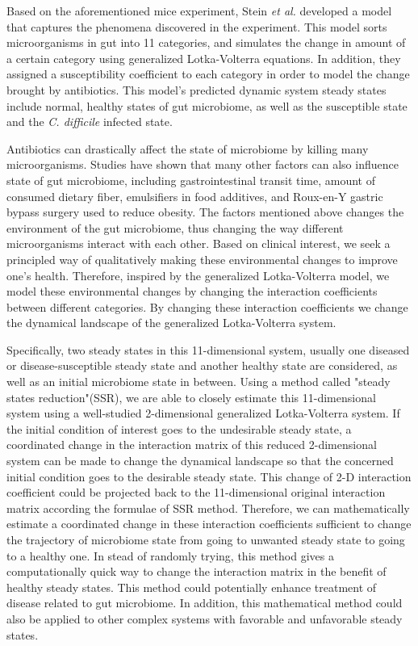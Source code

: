 \documentclass[10pt,letterpaper]{article}
\begin{document}
Based on the aforementioned mice experiment, Stein \textit{et al.} developed a model that captures the phenomena discovered in the experiment. This model sorts microorganisms in gut into 11 categories, and simulates the change in  amount of a certain category using generalized Lotka-Volterra equations. In addition, they assigned a susceptibility coefficient to each category in order to model the change brought by antibiotics. This model's predicted dynamic system steady states include normal, healthy states of gut microbiome, as well as the susceptible state and the \textit{C. difficile} infected state.

Antibiotics can drastically affect the state of microbiome by killing many microorganisms. Studies have shown that many other factors can also influence state of gut microbiome, including gastrointestinal transit time, amount of consumed dietary fiber, emulsifiers in food additives, and Roux-en-Y gastric bypass surgery used to reduce obesity. The factors mentioned above changes the environment of the gut microbiome, thus changing the way different microorganisms interact with each other. Based on clinical interest, we seek a principled way of qualitatively making these environmental changes to improve one's health. Therefore, inspired by the generalized Lotka-Volterra model, we model these environmental changes by changing the interaction coefficients between different categories. By changing these interaction coefficients we change the dynamical landscape of the generalized Lotka-Volterra system. 

Specifically, two steady states in this 11-dimensional system, usually one diseased or disease-susceptible steady state and another healthy state are considered, as well as an initial microbiome state in between. Using a method called "steady states reduction"(SSR), we are able to closely estimate this 11-dimensional system using a well-studied 2-dimensional generalized Lotka-Volterra system. If the initial condition of interest goes to the undesirable steady state, a coordinated change in the interaction matrix of this reduced 2-dimensional system can be made to change the dynamical landscape so that the concerned initial condition goes to the desirable steady state. This change of 2-D interaction coefficient could be projected back to the 11-dimensional original interaction matrix according the formulae of SSR method. Therefore, we can mathematically estimate a coordinated change in these interaction coefficients sufficient to change the trajectory of microbiome state from going to unwanted steady state to going to a healthy one. In stead of randomly trying, this method gives a computationally quick way to change the interaction matrix in the benefit of healthy steady states. This method could potentially enhance treatment of disease related to gut microbiome. In addition, this mathematical method could also be applied to other complex systems with favorable and unfavorable steady states.
\end{document}
